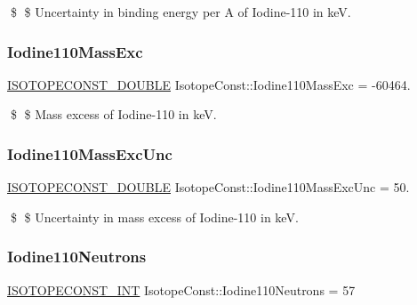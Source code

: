 \$ \$ Uncertainty in binding energy per A of Iodine-\/110 in keV. \mbox{\label{group___isotope_const-_iodine-_i110_ga610ff49c49acb95b2a2c1628a307485c}} 
\subsubsection{\texorpdfstring{Iodine110\+Mass\+Exc}{Iodine110MassExc}}
{\footnotesize\ttfamily \mbox{\hyperlink{group___isotope_const-_macros_ga8f45a7272ce02c0b4c65c44636ed719a}{I\+S\+O\+T\+O\+P\+E\+C\+O\+N\+S\+T\+\_\+\+D\+O\+U\+B\+LE}} Isotope\+Const\+::\+Iodine110\+Mass\+Exc = -\/60464.}

\$ \$ Mass excess of Iodine-\/110 in keV. \mbox{\label{group___isotope_const-_iodine-_i110_gac5fa7fefc688c38d7ae8586e029a0508}} 
\subsubsection{\texorpdfstring{Iodine110\+Mass\+Exc\+Unc}{Iodine110MassExcUnc}}
{\footnotesize\ttfamily \mbox{\hyperlink{group___isotope_const-_macros_ga8f45a7272ce02c0b4c65c44636ed719a}{I\+S\+O\+T\+O\+P\+E\+C\+O\+N\+S\+T\+\_\+\+D\+O\+U\+B\+LE}} Isotope\+Const\+::\+Iodine110\+Mass\+Exc\+Unc = 50.}

\$ \$ Uncertainty in mass excess of Iodine-\/110 in keV. \mbox{\label{group___isotope_const-_iodine-_i110_ga0a4f903111289070a828c6efc28e3bf4}} 
\subsubsection{\texorpdfstring{Iodine110\+Neutrons}{Iodine110Neutrons}}
{\footnotesize\ttfamily \mbox{\hyperlink{group___isotope_const-_macros_ga5f18360b3e99483a35c32d789e62621c}{I\+S\+O\+T\+O\+P\+E\+C\+O\+N\+S\+T\+\_\+\+I\+NT}} Isotope\+Const\+::\+Iodine110\+Neutrons = 57}

